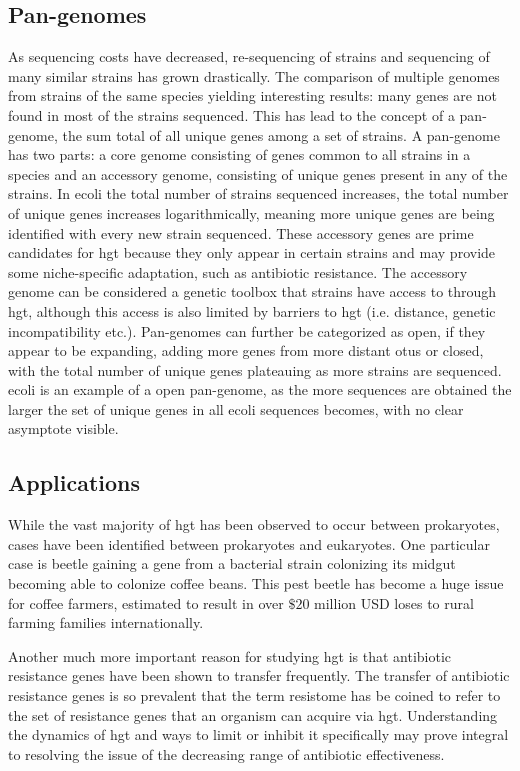 \subsection*{Pan-genomes}%
As sequencing costs have decreased, re-sequencing of strains and sequencing of many similar strains has grown drastically.
The comparison of multiple genomes from strains of the same species yielding interesting results: many genes are not found in most of the strains sequenced\citep{toolpan}.
This has lead to the concept of a pan-genome, the sum total of all unique genes among a set of strains\citep{pang}.
A pan-genome has two parts: a core genome consisting of genes common to all strains in a species and an accessory genome, consisting of unique genes present in any of the strains\citep{pang}.
In \ac{ecoli} the total number of strains sequenced increases, the total number of unique genes increases logarithmically, meaning more unique genes are being identified with every new strain sequenced\citep{ecopan}.
These accessory genes are prime candidates for \ac{hgt} because they only appear in certain strains and may provide some niche-specific adaptation, such as antibiotic resistance\citep{pang}.
The accessory genome can be considered a genetic toolbox that strains have access to through \ac{hgt}, although this access is also limited by barriers to \ac{hgt} (i.e. distance, genetic incompatibility etc.).
Pan-genomes can further be categorized as open, if they appear to be expanding, adding more genes from more distant \ac{otu}s or closed, with the total number of unique genes plateauing as more strains are sequenced\citep{pang}.
\ac{ecoli} is an example of a open pan-genome, as the more sequences are obtained the larger the set of unique genes in all \ac{ecoli} sequences becomes, with no clear asymptote visible\citep{pang}.
\subsection*{Applications}
While the vast majority of \ac{hgt} has been observed to occur between prokaryotes, cases have been identified between prokaryotes and eukaryotes.
One particular case is beetle gaining a gene from a bacterial strain colonizing its midgut becoming able to colonize coffee beans\citep{beetle}.
This pest beetle has become a huge issue for coffee farmers, estimated to result in over $\$20$ million USD loses to rural farming families internationally\citep{beetle}.\par
Another much more important reason for studying \ac{hgt} is that antibiotic resistance genes have been shown to transfer frequently\citep{amrhgt}.
The transfer of antibiotic resistance genes is so prevalent that the term resistome has be coined to refer to the set of resistance genes that an organism can acquire via \ac{hgt}\citep{amrhgt}.
Understanding the dynamics of \ac{hgt} and ways to limit or inhibit it specifically may prove integral to resolving the issue of the decreasing range of antibiotic effectiveness\citep{amrhgt}.
